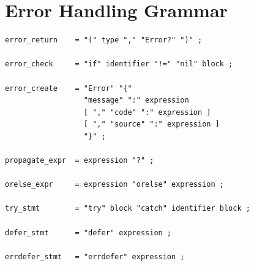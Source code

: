 \section{Error Handling Grammar}

\begin{lstlisting}[language=EBNF]
error_return    = "(" type "," "Error?" ")" ;

error_check     = "if" identifier "!=" "nil" block ;

error_create    = "Error" "{"
                  "message" ":" expression
                  [ "," "code" ":" expression ]
                  [ "," "source" ":" expression ]
                  "}" ;

propagate_expr  = expression "?" ;

orelse_expr     = expression "orelse" expression ;

try_stmt        = "try" block "catch" identifier block ;

defer_stmt      = "defer" expression ;

errdefer_stmt   = "errdefer" expression ;
\end{lstlisting}
